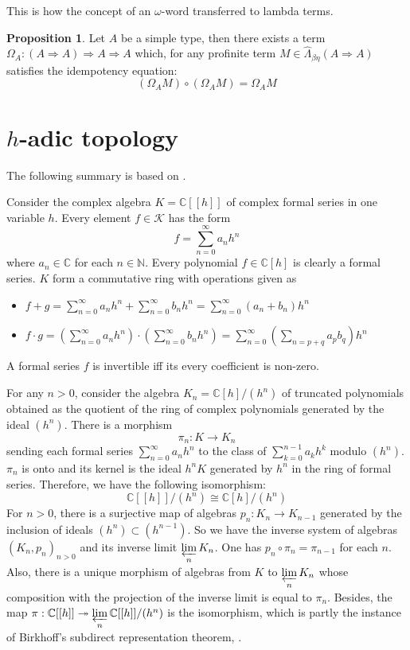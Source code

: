 \documentclass[8pt]{article}
\theoremstyle{definition}
\theoremstyle{definition}
\theoremstyle{definition}
\theoremstyle{definition}
\theoremstyle{definition}
\theoremstyle{definition}
\theoremstyle{definition}
\newtheorem{prop}{Proposition}[section]
\theoremstyle{definition}
\theoremstyle{definition}
\theoremstyle{definition}
\theoremstyle{definition}
\theoremstyle{definition}
\theoremstyle{definition}
\theoremstyle{definition}
\theoremstyle{question}
\begin{document}
  This is how the concept of an $\omega$-word transferred to lambda terms.
  \begin{prop}
    Let $A$ be a simple type, then there exists a term $\Omega_A : (A \Rightarrow A) \Rightarrow A \Rightarrow A$
    which, for any profinite term $M \in \widehat{\Lambda}_{\beta \eta} (A \Rightarrow A)$ satisfies the idempotency equation:
    \[
    (\Omega_A M) \circ (\Omega_A M) = \Omega_A M
    \]
  \end{prop}


\section{$h$-adic topology}

The following summary is based on \cite[Chapter XVI]{kassel2012quantum}.

Consider the complex algebra $K = \mathbb{C}[[h]]$ of complex formal series
in one variable $h$. Every element $f \in \mathcal{K}$ has the form
\[
f = \sum \limits_{n = 0}^{\infty} a_n h^n
\]
where $a_n \in \mathbb{C}$ for each $n \in \mathbb{N}$. Every polynomial $f \in \mathbb{C}[h]$ is clearly a formal series. $K$ form a commutative ring with operations given as
\begin{itemize}
  \item $f + g = \sum \limits_{n = 0}^{\infty} a_n h^n + \sum \limits_{n = 0}^{\infty} b_n h^n = \sum \limits_{n = 0}^{\infty} (a_n + b_n) h^n$
  \item $f \cdot g = (\sum \limits_{n = 0}^{\infty} a_n h^n) \cdot (\sum \limits_{n = 0}^{\infty} b_n h^n) = \sum \limits_{n=0}^{\infty} (\sum \limits_{n = p + q} a_p b_q) h^n$
\end{itemize}
A formal series $f$ is invertible iff its every coefficient is non-zero.

For any $n > 0$, consider the algebra $K_n = \mathbb{C}[h]/(h^n)$
of truncated polynomials obtained as the quotient of the ring of complex
polynomials generated by the ideal $(h^n)$. There is a morphism
\[
\pi_n : K \to K_n
\]
sending each formal series $\sum \limits_{n = 0}^{\infty} a_n h^n$
to the class of $\sum \limits_{k = 0}^{n - 1} a_k h^k$ modulo $(h^n)$.
$\pi_n$ is onto and its kernel is the ideal $h^n K$ generated by $h^n$
in the ring of formal series. Therefore, we have the following isomorphism:
\[
\mathbb{C}[[h]]/(h^n) \cong \mathbb{C}[h]/(h^n)
\]
For $n > 0$, there is a surjective map of algebras $p_n : K_n \to K_{n - 1}$
generated by the inclusion of ideals $(h^{n}) \subset (h^{n-1})$. 
So we have the inverse system of algebras $(K_n, p_n)_{n > 0}$ and its inverse
limit $\varprojlim \limits_{n} K_n$. One has $p_n \circ \pi_n = \pi_{n - 1}$
for each $n$. Also, there is a unique morphism of algebras from $K$ to
$\varprojlim \limits_{n} K_n$ whose composition
with the projection of the inverse limit is equal to $\pi_n$. 
Besides, the map $\pi : \mathbb{C}[[h]] \twoheadrightarrow \varprojlim \limits_{n} \mathbb{C}[[h]] / (h^n)$
is the isomorphism, which is partly the instance of Birkhoff’s subdirect representation theorem, \cite[Theorem 8.6]{sankappanavar1981course}.
\end{document}
